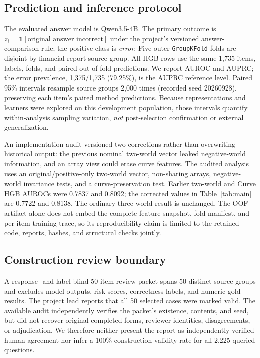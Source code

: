 \documentclass[11pt]{article}
\begin{document}
\subsection{Prediction and inference protocol}
The evaluated answer model is Qwen3.5-4B. The primary outcome is $z_i=\mathbf{1}[\text{original answer incorrect}]$ under the project's versioned answer-comparison rule; the positive class is \emph{error}. Five outer \texttt{GroupKFold} folds are disjoint by financial-report source group. All HGB rows use the same 1,735 items, labels, folds, and paired out-of-fold predictions. We report AUROC and AUPRC; the error prevalence, 1,375/1,735 (79.25\%), is the AUPRC reference level. Paired 95\% intervals resample source groups 2,000 times (recorded seed 20260928), preserving each item's paired method predictions. Because representations and learners were explored on this development population, those intervals quantify within-analysis sampling variation, \emph{not} post-selection confirmation or external generalization.

An implementation audit versioned two corrections rather than overwriting historical output: the previous nominal two-world vector leaked negative-world information, and an array view could erase curve features. The audited analysis uses an original/positive-only two-world vector, non-sharing arrays, negative-world invariance tests, and a curve-preservation test. Earlier two-world and Curve HGB AUROCs were 0.7837 and 0.8092; the corrected values in Table~\ref{tab:main} are 0.7722 and 0.8138. The ordinary three-world result is unchanged. The OOF artifact alone does not embed the complete feature snapshot, fold manifest, and per-item training trace, so its reproducibility claim is limited to the retained code, reports, hashes, and structural checks jointly.

\subsection{Construction review boundary}
A response- and label-blind 50-item review packet spans 50 distinct source groups and excludes model outputs, risk scores, correctness labels, and numeric gold results. The project lead reports that all 50 selected cases were marked valid. The available audit independently verifies the packet's existence, contents, and seed, but did not recover original completed forms, reviewer identities, disagreements, or adjudication. We therefore neither present the report as independently verified human agreement nor infer a 100\% construction-validity rate for all 2,225 queried questions.
\end{document}
